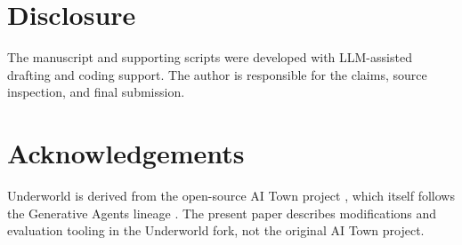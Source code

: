 \documentclass[11pt]{article}
\begin{document}
\section*{Disclosure}

The manuscript and supporting scripts were developed with LLM-assisted drafting and coding support. The author is responsible for the claims, source inspection, and final submission.

\section*{Acknowledgements}

Underworld is derived from the open-source AI Town project \cite{aitown}, which itself follows the Generative Agents lineage \cite{park2023generative}. The present paper describes modifications and evaluation tooling in the Underworld fork, not the original AI Town project.
\end{document}
